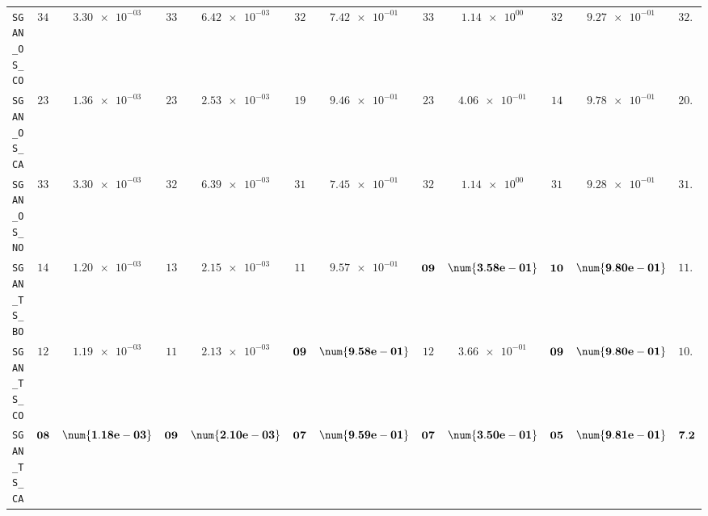 \begin{table}[H]
\begin{tabularx}{\textwidth}{l||cC|cC|cC|cC|cC||c}
		\texttt{SGAN\_OS\_CO} & $ 34$ & $ \num{3.30e-03}$ & $ 33$ & $ \num{6.42e-03}$ & $ 32$ & $ \num{7.42e-01}$ & $ 33$ & $ \num{1.14e+00}$ & $ 32$ & $ \num{9.27e-01}$ & $ 32.8$  \\
		\texttt{SGAN\_OS\_CA} & $ 23$ & $ \num{1.36e-03}$ & $ 23$ & $ \num{2.53e-03}$ & $ 19$ & $ \num{9.46e-01}$ & $ 23$ & $ \num{4.06e-01}$ & $ 14$ & $ \num{9.78e-01}$ & $ 20.4$  \\
		\texttt{SGAN\_OS\_NO} & $ 33$ & $ \num{3.30e-03}$ & $ 32$ & $ \num{6.39e-03}$ & $ 31$ & $ \num{7.45e-01}$ & $ 32$ & $ \num{1.14e+00}$ & $ 31$ & $ \num{9.28e-01}$ & $ 31.8$  \\
		\texttt{SGAN\_TS\_BO} & $ 14$ & $ \num{1.20e-03}$ & $ 13$ & $ \num{2.15e-03}$ & $ 11$ & $ \num{9.57e-01}$ & $\bf 09$ & $\bf \num{3.58e-01}$ & $\bf 10$ & $\bf \num{9.80e-01}$ & $ 11.4$  \\
		\texttt{SGAN\_TS\_CO} & $ 12$ & $ \num{1.19e-03}$ & $ 11$ & $ \num{2.13e-03}$ & $\bf 09$ & $\bf \num{9.58e-01}$ & $ 12$ & $ \num{3.66e-01}$ & $\bf 09$ & $\bf \num{9.80e-01}$ & $ 10.6$  \\
		\texttt{SGAN\_TS\_CA} & $\bf 08$ & $\bf \num{1.18e-03}$ & $\bf 09$ & $\bf \num{2.10e-03}$ & $\bf 07$ & $\bf \num{9.59e-01}$ & $\bf 07$ & $\bf \num{3.50e-01}$ & $\bf 05$ & $\bf \num{9.81e-01}$ & $\bf 7.2$  \\

\end{tabularx}
\end{table}
